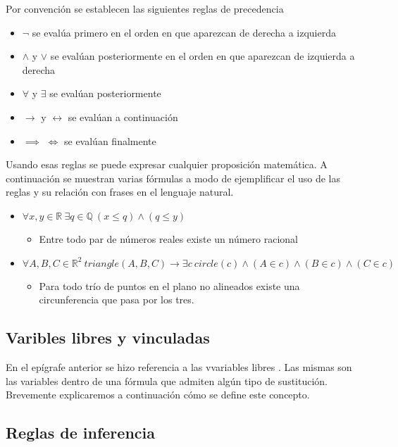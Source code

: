 Por convención se establecen las siguientes reglas de precedencia

\begin{itemize}
	\item{$\neg$ se evalúa primero en el orden en que aparezcan de derecha a izquierda}
	\item{$\land$ y $\lor$ se evalúan posteriormente en el orden en que aparezcan de izquierda a derecha}
	\item{$\forall$ y $\exists$ se evalúan posteriormente}
	\item{$\to$ y $\leftrightarrow$ se evalúan a continuación}
	\item{$\implies$ $\iff$ se evalúan finalmente}
\end{itemize}

Usando esas reglas se puede expresar cualquier proposición matemática. A continuación se muestran varias fórmulas a modo de ejemplificar el uso de las reglas y su relación con frases en el lenguaje natural.

\begin{itemize}
	\item{$\forall x,y \in \mathbb{R}\ \exists q \in \mathbb{Q}\ (x \leq q) \land (q \leq y)$ }
		\begin{itemize}
			\item{Entre todo par de números reales existe un número racional}
		\end{itemize}
	\item{$\forall A,B,C \in \mathbb{R}^2\ triangle(A, B, C) \to \exists c\ circle(c) \land (A \in c) \land (B \in c) \land (C \in c)$ }
		\begin{itemize}
			\item{Para todo trío de puntos en el plano no alineados existe una circunferencia que pasa por los tres.}
		\end{itemize}
\end{itemize}

\subsection{Varibles libres y vinculadas}

En el epígrafe anterior se hizo referencia a las vvariables libres . Las mismas son las variables dentro de una fórmula que admiten algún tipo de sustitución. Brevemente explicaremos a continuación cómo se define este concepto.



\subsection{Reglas de inferencia}

